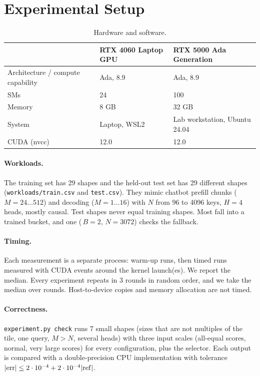 \documentclass[11pt]{article}
\begin{document}
\section{Experimental Setup}

\begin{table}[H]
\centering
\caption{Hardware and software.}
\label{tab:hw}
\begin{tabular}{lll}
\toprule
 & RTX 4060 Laptop GPU & RTX 5000 Ada Generation \\
\midrule
Architecture / compute capability & Ada, 8.9 & Ada, 8.9 \\
SMs & 24 & 100 \\
Memory & 8 GB & 32 GB \\
System & Laptop, WSL2 & Lab workstation, Ubuntu 24.04 \\
CUDA (nvcc) & 12.0 & 12.0 \\
\bottomrule
\end{tabular}
\end{table}

\paragraph{Workloads.} The training set has 29 shapes and the held-out test set
has 29 different shapes (\texttt{workloads/train.csv} and \texttt{test.csv}).
They mimic chatbot prefill chunks ($M = 24\ldots512$) and decoding
($M = 1\ldots16$) with $N$ from 96 to 4096 keys, $H = 4$ heads, mostly causal.
Test shapes never equal training shapes. Most fall into a trained bucket,
and one (\,$B = 2$, $N = 3072$) checks the fallback.

\paragraph{Timing.} Each measurement is a separate process: warm-up runs, then
timed runs measured with CUDA events around the kernel launch(es). We report
the median. Every experiment repeats in 3 rounds in random order, and we take
the median over rounds. Host-to-device copies and memory allocation are not timed.

\paragraph{Correctness.} \texttt{experiment.py check} runs 7 small shapes
(sizes that are not multiples of the tile, one query, $M > N$, several heads) with
three input scales (all-equal scores, normal, very large scores) for every
configuration, plus the selector. Each output is compared with a
double-precision CPU implementation with tolerance
$|{\rm err}| \le 2\cdot10^{-4} + 2\cdot10^{-4}|{\rm ref}|$.
\end{document}
